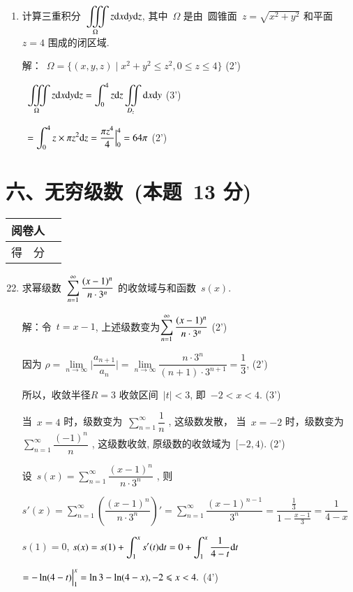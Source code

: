 \documentclass[twocolumn,landscape,fntef,UTF8]{ctexart}
\begin{document}
\begin{enumerate}
			\vspace{1cm}
			\item 计算三重积分~$\displaystyle{\iiint\limits_{\Omega}z \mathrm{d}x\mathrm{d}y\mathrm{d}z}$, 其中~$\Omega$ 是由~圆锥面~$z = \sqrt{x^2+ y^2}$ 和平面~$z=4$ 围成的闭区域.
			
			解：~$\Omega = \{(x,y,z)\mid x^2 + y^2 \leqslant z^2,0\leqslant z\leqslant 4\}$ \dotfill{}(2')
			
			~$ \displaystyle{\iiint\limits_{\Omega}z \mathrm{d}x\mathrm{d}y\mathrm{d}z =  \int_0^4 z \mathrm{d}z \iint\limits_{D_z}\mathrm{d}x\mathrm{d}y}$ \dotfill{}(3')
			
			~$  = \displaystyle{\int_0^4z\times \pi z^2\mathrm{d}z= \dfrac{\pi z^4}{4}\Big|_0^4=64\pi}$ \dotfill{}(2')
		\end{enumerate}
		\newpage
		\putzdx %
		\section*{\hspace{5cm} 六、无穷级数~(本题~13 分)}
		\vspace{-2cm}
		\begin{tabular}{|p{}|p{}|}
			\hline
			\centering  阅卷人& \\
			\hline
			\centering 得~~分 &  \\
			\hline
		\end{tabular}

		\begin{enumerate}\setcounter{enumi}{21}
			\item 求幂级数~$\displaystyle{\sum\limits_{n=1}^\infty\dfrac{(x-1)^n}{n\cdot3^n}} $ 的收敛域与和函数~$s(x)$.
			
			解：令~$t = x-1$, 上述级数变为$\displaystyle{\sum\limits_{n=1}^\infty\dfrac{(x-1)^n}{n\cdot3^n}} $  \dotfill{}(2')
			
			因为 $\rho = \lim\limits_{n\rightarrow\infty}\Big| \dfrac{a_{n+1}}{a_{n}}\Big| = \lim\limits_{n\rightarrow\infty}\dfrac{n\cdot3^n}{(n+1)\cdot3^{n+1}} = \dfrac{1}{3}$, \dotfill{}(2')
			
			所以，收敛半径$R=3 $ 收敛区间~$|t|<3$, 即~$-2<x<4$. \dotfill{}(3')
			
			当~$x = 4$ 时，级数变为~$\sum\limits_{n=1}^\infty\dfrac{1}{n}$ , 这级数发散， 当~$x = -2$ 时，级数变为~$\sum\limits_{n=1}^\infty\dfrac{(-1)^n}{n}$ , 这级数收敛, 原级数的收敛域为~$[-2,4)$.  \dotfill{}(2')
			
			设~$s(x) = \sum\limits_{n=1}^\infty\dfrac{(x-1)^n}{n\cdot3^n}$ , 则
			
			$s'(x) = \sum\limits_{n=1}^\infty\left(\dfrac{(x-1)^n}{n\cdot3^n}\right)' = \sum\limits_{n=1}^\infty\dfrac{(x-1)^{n-1}}{3^n} = \dfrac{\frac{1}{3}}{1-\frac{x-1}{3}}=\dfrac{1}{4-x}$
			
			$s(1) = 0$, $s(x) = s(1)+\displaystyle{\int_1^x s'(t)\mathrm{d}t = 0 + \int_1^x\dfrac{1}{4-t}\mathrm{d}t }$
			
			$\displaystyle{ =-\ln(4-t)\Big|_1^x = \ln3-\ln(4-x),-2\leqslant x<4.}$ \dotfill{}(4')
		\end{enumerate}
	
\end{document}
